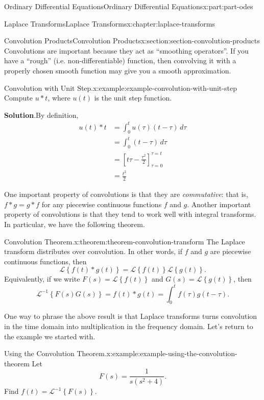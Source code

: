 \documentclass[oneside,10pt,]{book}
\newcommand{\blocktitlefont}{\relax}
\numberwithin{equation}{part}
\newcommand{\Int}[2]{\int_{#1}^{#2}}
\newcommand{\Laplace}[1]{\mathcal{L}\left\{#1\right\}}
\newcommand{\iLaplace}[1]{\mathcal{L}^{-1}\left\{#1\right\}}
\newcommand{\amp}{&}
\begin{document}
\begin{partptx}{Ordinary Differential Equations}{}{Ordinary Differential Equations}{}{}{x:part:part-odes}
\begin{chapterptx}{Laplace Transforms}{}{Laplace Transforms}{}{}{x:chapter:laplace-transforms}
\begin{sectionptx}{Convolution Products}{}{Convolution Products}{}{}{x:section:section-convolution-products}
Convolutions are important because they act as ``smoothing operators''. If you have a ``rough'' (i.e. non-differentiable) function, then convolving it with a properly chosen smooth function may give you a smooth approximation.%
\begin{example}{Convolution with Unit Step.}{x:example:example-convolution-with-unit-step}%
Compute \(u\ast t\), where \(u(t)\) is the unit step function.%
\par\smallskip%
\noindent\textbf{\blocktitlefont Solution}.\hypertarget{g:solution:idp105548781576224}{}\quad{}By definition,%
\begin{align*}
u(t)\ast t \amp= \Int{0}{t}u(\tau)(t-\tau)\,d\tau \\
\amp= \Int{0}{t}(t-\tau)\,d\tau \\
\amp= \left[t\tau-\frac{\tau^{2}}{2}\right]_{\tau=0}^{\tau=t} \\
\amp= \frac{t^{2}}{2}
\end{align*}
%
\end{example}
One important property of convolutions is that they are \emph{commutative}: that is, \(f\ast g = g\ast f\) for any piecewise continuous functions \(f\) and \(g\). Another important property of convolutions is that they tend to work well with integral transforms. In particular, we have the following theorem.%
\begin{theorem}{Convolution Theorem.}{}{x:theorem:theorem-convolution-transform}%
The Laplace transform distributes over convolution. In other words, if \(f\) and \(g\) are piecewise continuous functions, then%
\begin{equation*}
\Laplace{f(t)\ast g(t)} = \Laplace{f(t)}\Laplace{g(t)}.
\end{equation*}
Equivalently, if we write \(F(s) = \Laplace{f(t)}\) and \(G(s) = \Laplace{g(t)}\), then%
\begin{equation*}
\iLaplace{F(s)G(s)} = f(t)\ast g(t) = \Int{0}{t}f(\tau)g(t-\tau).
\end{equation*}
%
\end{theorem}
One way to phrase the above result is that Laplace transforms turns convolution in the time domain into multiplication in the frequency domain. Let's return to the example we started with.%
\begin{example}{Using the Convolution Theorem.}{x:example:example-using-the-convolution-theorem}%
Let%
\begin{equation*}
F(s) = \frac{1}{s(s^{2}+4)}.
\end{equation*}
Find \(f(t) = \iLaplace{F(s)}\).%

\end{example}
\end{sectionptx}
\end{chapterptx}
\end{partptx}
\end{document}
